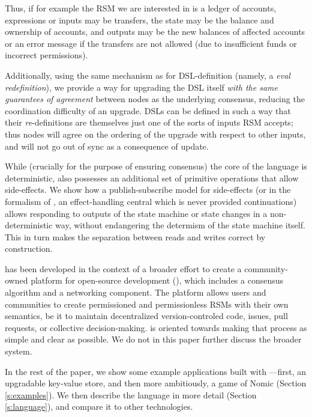 Thus, if for example the RSM we are interested
in is a ledger of accounts, expressions or inputs may be transfers, the
state may be the balance and ownership of accounts, and outputs may be the new
balances of affected accounts or an error message if the transfers are not
allowed (due to insufficient funds or incorrect permissions).

Additionally, using the same mechanism as for DSL-definition (namely, a
\emph{eval redefinition}), we provide a way for upgrading the DSL itself
\emph{with the same guarantees of agreement} between nodes as the underlying
consensus, reducing the coordination difficulty of an upgrade. DSLs can be
defined in such a way that their \emph{re}-definitions are themselves just one of the
sorts of inputs RSM accepts; thus nodes will agree on the ordering of the
upgrade with respect to other inputs, and will not go out of sync as a
consequence of update.

While (crucially for the purpose of ensuring consensus) the core of the language
is deterministic, \rad{} also possesses an additional set of primitive operations
that allow side-effects. We show how a publish-subscribe model for side-effects
(or in the formalism of \cite{Cartwright1994}, an effect-handling central which
is never provided continuations) allows responding to outputs of the state
machine or state changes in a non-deterministic way, without endangering the
determism of the state machine itself. This in turn makes the separation between
reads and writes correct by construction.

\rad{} has been developed in the context of a broader effort to create a
community-owned platform for open-source development (\oscoin{}), which
includes a consensus algorithm and a networking component. The \oscoin{}
platform allows users and communities to create permissioned and permissionless
RSMs with their own semantics, be it to maintain decentralized
version-controled code, issues, pull requests, or collective decision-making.
\rad{} is
oriented towards making that process as simple and clear as possible. We do
not in this paper further discuss the broader \oscoin{} system.

In the rest of the paper, we show some example applications built with
\rad{}---first, an upgradable key-value store, and then more ambitiously, a game
of Nomic (Section \ref{s:examples}). We then describe the language in more
detail (Section \ref{s:language}), and compare it to other technologies.
